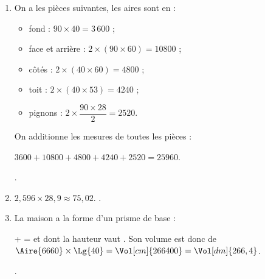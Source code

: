 \begin{Maquette}[Fiche,CorrigeFin,Colonnes=2]{}
\begin{multicols}{2}
         \begin{Solution}
            \begin{enumerate}
               \item On a les pièces suivantes, les aires sont en \Aire{} :
                  \begin{itemize}
                     \item fond : $90\times40 =3\,600$ ;
                     \item face et arrière : $2\times(90\times60) =\num{10800}$ ;
                     \item côtés : $2\times(40\times60) =\num{4800}$ ; 
                     \item toit : $2\times(40\times53) =\num{4240}$ ; \smallskip
                     \item pignons : $2\times\dfrac{90\times28}{2} =\num{2520}$. \smallskip
                  \end{itemize}
                  On additionne les mesures de toutes les pièces : \par
                  $\num{3600}+\num{10800}+\num{4800}+\num{4240}+\num{2520} =\num{25960}$. \par
                  .
               \item $2,596\times28,9 \approx75,02$.  
                  .
               \item La maison a la forme d'un prisme de base : \par
                   +  =  et dont la hauteur vaut . Son volume est donc de $\Aire{6660}\times\Lg{40} =\Vol[cm]{266400} =\Vol[dm]{266,4}$. \par
                  .
            \end{enumerate}
         \end{Solution}

   \end{multicols}

\end{Maquette}


